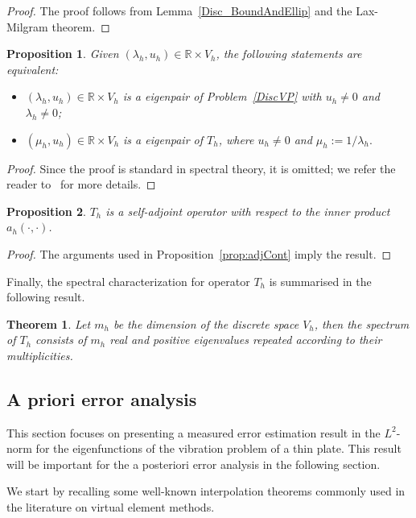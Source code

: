 \documentclass[final,reqno]{elsarticle}
\newtheorem{proposition}{Proposition}[section]
\newtheorem{theorem}{Theorem}[section]
\def\R{\mathbb{R}}
\def\Vh{V_h}
\def\Vh{V_h}
\def\R{\mathbb{R}}
\begin{document}
\begin{proof}
The proof follows from  Lemma~\ref{Disc_BoundAndEllip} and the Lax-Milgram theorem.
\end{proof}

\begin{proposition}
Given $(\lambda_h,u_h)\in\R\times V_h$, the following statements are equivalent:
\begin{itemize}
\item $(\lambda_h,u_h)\in\R\times V_h$ is a eigenpair of Problem~\ref{DiscVP} with $u_h\neq 0$ and $\lambda_h\neq 0$;
\item $(\mu_h, u_h)\in\R\times V_h$ is a eigenpair of $T_h$, where $u_h\neq 0$ and $\mu_h:=1/\lambda_h.$
\end{itemize}
\end{proposition}

\begin{proof}
Since the proof is standard in spectral theory, it is omitted; we refer the reader to~\cite{SunZhou2016} for more details.
\end{proof}

\begin{proposition}
$T_h$ is a self-adjoint operator with respect to the inner product $a_h(\cdot,\cdot)$. 
\end{proposition}

\begin{proof}
The arguments used in Proposition~\ref{prop:adjCont} imply the result.
\end{proof}

Finally, the spectral characterization for operator $T_h$ is summarised in the following result.


\begin{theorem}
Let $m_h$ be the dimension of the discrete space $\Vh$, 
then the spectrum of $T_h$ consists of $m_h$ real and positive eigenvalues repeated according to their multiplicities. 
\end{theorem}

\subsection{A priori error analysis}
This section focuses on presenting a measured error estimation result in the $L^2$-norm for the eigenfunctions of the vibration problem of a thin plate. This result will be important for the a posteriori error analysis in the following section.

We start  by recalling some well-known interpolation theorems commonly used in the literature on virtual element methods.
\end{document}
